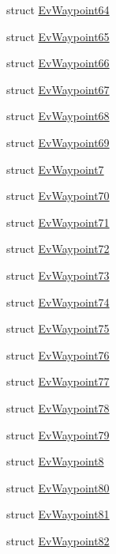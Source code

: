\begin{DoxyCompactItemize}
\item 
struct \hyperlink{structcl__move__base__z_1_1EvWaypoint64}{Ev\+Waypoint64}
\item 
struct \hyperlink{structcl__move__base__z_1_1EvWaypoint65}{Ev\+Waypoint65}
\item 
struct \hyperlink{structcl__move__base__z_1_1EvWaypoint66}{Ev\+Waypoint66}
\item 
struct \hyperlink{structcl__move__base__z_1_1EvWaypoint67}{Ev\+Waypoint67}
\item 
struct \hyperlink{structcl__move__base__z_1_1EvWaypoint68}{Ev\+Waypoint68}
\item 
struct \hyperlink{structcl__move__base__z_1_1EvWaypoint69}{Ev\+Waypoint69}
\item 
struct \hyperlink{structcl__move__base__z_1_1EvWaypoint7}{Ev\+Waypoint7}
\item 
struct \hyperlink{structcl__move__base__z_1_1EvWaypoint70}{Ev\+Waypoint70}
\item 
struct \hyperlink{structcl__move__base__z_1_1EvWaypoint71}{Ev\+Waypoint71}
\item 
struct \hyperlink{structcl__move__base__z_1_1EvWaypoint72}{Ev\+Waypoint72}
\item 
struct \hyperlink{structcl__move__base__z_1_1EvWaypoint73}{Ev\+Waypoint73}
\item 
struct \hyperlink{structcl__move__base__z_1_1EvWaypoint74}{Ev\+Waypoint74}
\item 
struct \hyperlink{structcl__move__base__z_1_1EvWaypoint75}{Ev\+Waypoint75}
\item 
struct \hyperlink{structcl__move__base__z_1_1EvWaypoint76}{Ev\+Waypoint76}
\item 
struct \hyperlink{structcl__move__base__z_1_1EvWaypoint77}{Ev\+Waypoint77}
\item 
struct \hyperlink{structcl__move__base__z_1_1EvWaypoint78}{Ev\+Waypoint78}
\item 
struct \hyperlink{structcl__move__base__z_1_1EvWaypoint79}{Ev\+Waypoint79}
\item 
struct \hyperlink{structcl__move__base__z_1_1EvWaypoint8}{Ev\+Waypoint8}
\item 
struct \hyperlink{structcl__move__base__z_1_1EvWaypoint80}{Ev\+Waypoint80}
\item 
struct \hyperlink{structcl__move__base__z_1_1EvWaypoint81}{Ev\+Waypoint81}
\item 
struct \hyperlink{structcl__move__base__z_1_1EvWaypoint82}{Ev\+Waypoint82}
\item 

\end{DoxyCompactItemize}
